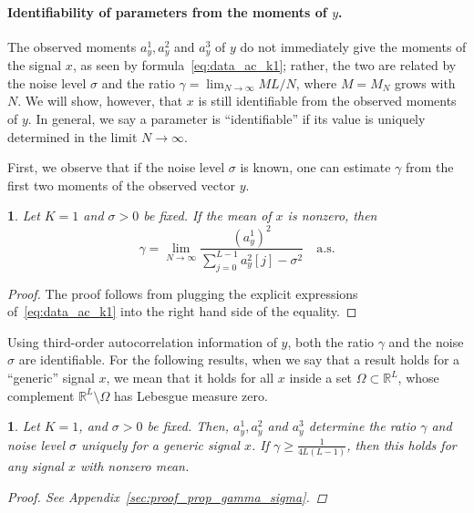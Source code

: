 \documentclass[english,11pt]{article}
\newcommand{\1}{\mathbf{1}}
\numberwithin{equation}{section}
\theoremstyle{plain}
\theoremstyle{definition}
\theoremstyle{remark}
\theoremstyle{plain}
\theoremstyle{remark}
\theoremstyle{plain}
\theoremstyle{plain}
\newtheorem{proposition}[thm]{\protect\propositionname}
\providecommand{\propositionname}{Proposition}
\newcommand{\RL}{\mathbb{R}^L}
\begin{document}
\paragraph{Identifiability of parameters from the moments of $y$.}

The observed moments $a_y^1,a_y^2$ and $a_y^3$ of $y$ do not immediately give the moments of the signal $x$, as seen by formula~\eqref{eq:data_ac_k1}; rather, the two are related by the noise level $\sigma$ and the ratio $\gamma = \lim_{N\to\infty}ML/N$, where $M=M_N$ grows with $N$. We will show, however, that $x$ is still identifiable from the observed moments of $y$. In general, we say a parameter is ``identifiable'' if its value is uniquely determined in the limit $N \to \infty$.

First, we observe that if the noise level $\sigma$ is known, one can estimate $\gamma$ from the first two moments of the observed vector $y$.
%
\begin{proposition} \label{prop:gamma}
	Let $K=1$ and $\sigma > 0$ be fixed. If the mean of $x$ is nonzero, then 
	\begin{equation*}
	\gamma = \lim_{N \to \infty}\frac{(a^1_y)^2}{\sum_{j=0}^{L-1}a_y^2[j]-\sigma^2} \quad \text{a.s.}
	\end{equation*}
\end{proposition}
\begin{proof}
	The proof follows from plugging the explicit expressions of~\eqref{eq:data_ac_k1} into the right hand side of the equality.
\end{proof}

Using third-order autocorrelation information of $y$, both the ratio $\gamma$ and the noise $\sigma$ are identifiable. For the following results, when we say that a result holds for a ``generic'' signal $x$, we mean that it holds for all $x$ inside a set $\Omega \subset \RL$, whose complement $\RL \setminus \Omega$ has Lebesgue measure zero.

\begin{proposition} \label{prop:gamma_sigma}
	Let $K=1$, and $\sigma > 0$ be fixed. Then, $a_y^1,a_y^2$ and  $a_y^3$ determine the ratio $\gamma$ and noise level $\sigma$ uniquely for a generic signal $x$. If $\gamma\geq\frac{1}{4L(L-1)}$, then this holds for any signal $x$ with nonzero mean. 
	\begin{proof}
		See Appendix~\ref{sec:proof_prop_gamma_sigma}.
	\end{proof}
\end{proposition}
\end{document}
